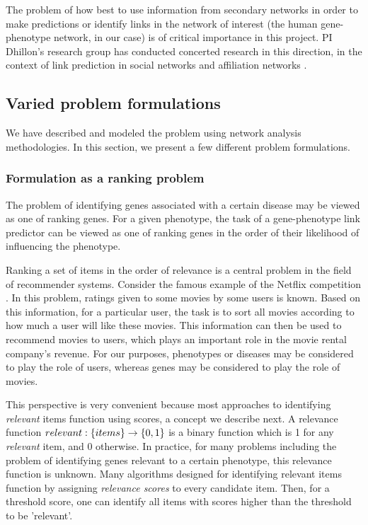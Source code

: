 The problem of how best to use information from secondary networks in order to make predictions or identify links in the network of interest (the human gene-phenotype network, in our case) is of critical importance in this project. PI Dhillon's research group has conducted concerted research in this direction, in the context of link prediction in social networks\cite{berkantSupervised} and affiliation networks \cite{vasukiNatarajan}.

\subsection{Varied problem formulations}
\label{section:problemFormulation}
We have described and modeled the problem using network analysis methodologies. In this section, we present a few different problem formulations.

\subsubsection{Formulation as a ranking problem}
\label{forumulationRankingProblem}
The problem of identifying genes associated with a certain disease may be viewed as one of ranking genes. For a given phenotype, the task of a gene-phenotype link predictor can be viewed as one of ranking genes in the order of their likelihood of influencing the phenotype.

Ranking a set of items in the order of relevance is a central problem in the field of recommender systems. Consider the famous example of the Netflix competition \cite{yehudaMillionDollar}. In this problem, ratings given to some movies by some users is known. Based on this information, for a particular user, the task is to sort all movies according to how much a user will like these movies. This information can then be used to recommend movies to users, which plays an important role in the movie rental company's revenue. For our purposes, phenotypes or diseases may be considered to play the role of users, whereas genes may be considered to play the role of movies.

This perspective is very convenient because most approaches to identifying \textit{relevant} items function using scores, a concept we describe next. A relevance function $relevant:\left\{ items \right\} \to \left\{ 0, 1 \right\}$ is a binary function which is 1 for any \textit{relevant} item, and 0 otherwise. In practice, for many problems including the problem of identifying genes relevant to a certain phenotype, this relevance function is unknown. Many algorithms designed for identifying relevant items function by assigning \textit{relevance scores} to every candidate item. Then, for a threshold score, one can identify all items with scores higher than the threshold to be 'relevant'.


